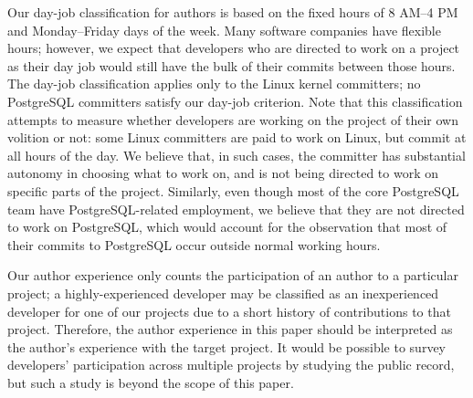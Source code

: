 Our day-job classification for authors is based on the fixed hours of
8 AM--4 PM and Monday--Friday days of the week. Many software companies
have flexible hours; however, we expect that developers who are
directed to work on a project as their day job would still have the
bulk of their commits between those hours. The day-job classification
applies only to the Linux kernel committers; no PostgreSQL committers
satisfy our day-job criterion. Note that this classification attempts
to measure whether developers are working on the project of their own
volition or not: some Linux committers 
are paid to work on Linux, but commit at all hours of the day. 
We believe that, in
such cases, the committer has substantial autonomy in
choosing what to work on, and is not being directed to work on
specific parts of the project. Similarly, even though most of the
core PostgreSQL team have PostgreSQL-related employment, we believe
that they are not directed to work on PostgreSQL, which would account
for the observation that most of their commits to PostgreSQL occur
outside normal working hours.

Our author experience only counts the participation of an author to
a particular project; a highly-experienced developer may be classified as an
inexperienced developer for one of our projects due to a short history of
contributions to that project. 
Therefore, the author experience in this paper should be interpreted as the 
author's experience with the target project. 
It would be possible to
survey developers' participation across multiple projects by studying the public
record, but such a study is beyond the scope of this paper.
